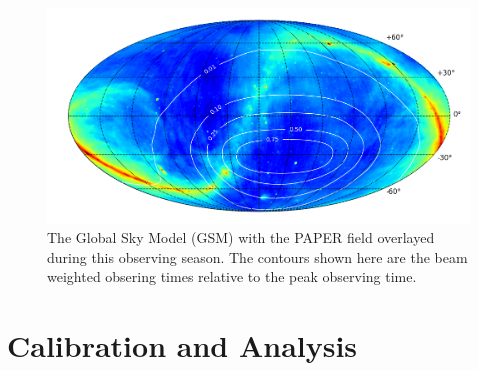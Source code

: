 \documentclass[twocolumn,numberedappendix]{emulateapj} \shorttitle{PSA64}
\begin{document}
\begin{figure}[!t]\centering
\includegraphics[width=2\columnwidth,height=\columnwidth]{plots/coverage.png}
\caption{The Global Sky Model (GSM) with the PAPER field overlayed during this
observing season. The contours shown here are the beam weighted obsering times
relative to the peak observing time.}
\label{fig:coverage}
\end{figure}


\section{Calibration and Analysis}\label{sec:analysis}
\end{document}
